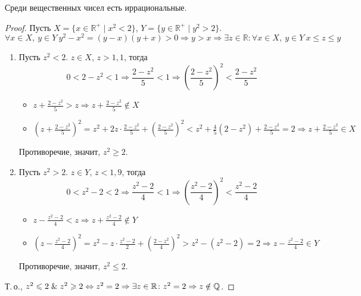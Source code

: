 \begin{statement}
Среди вещественных чисел есть иррациональные.
\end{statement}
\begin{proof}
Пусть $X = \{ x \in \mathbb R^+ \mid x^2 < 2 \}$, $Y = \{ y \in \mathbb R^+ \mid y^2 > 2 \}$.
\begin{equation*}
\forall x \in X, \ y \in Y \ y^2 - x^2 = (y - x)(y + x) > 0 \Rightarrow y > x \Rightarrow
\exists z \in \mathbb R \colon \forall x \in X, \ y \in Y \ x \leqslant z \leqslant y
\end{equation*}

\begin{enumerate}
	\item Пусть $z^2 < 2$. $z \in X$, $z > 1{,}1$, тогда
	\begin{equation*}
	0 < 2 - z^2 < 1 \Rightarrow \frac{2 - z^2}5 < 1 \Rightarrow
	\left( \frac{2 - z^2}5 \right)^2 < \frac{2 - z^2}5
	\end{equation*}
	
	\begin{itemize}
		\item $\displaystyle z + \frac{2 - z^2}5 > z \Rightarrow z + \frac{2 - z^2}5 \notin X$
		
		\item $\displaystyle \left( z + \frac{2 - z^2}5 \right)^2 =
		z^2 + 2z\cdot\frac{2 - z^2}5 + \left( \frac{2 - z^2}5 \right)^2 <
		z^2 + \frac45 (2 - z^2) + \frac{2 - z^2}5 = 2 \Rightarrow z + \frac{2 - z^2}5 \in X$
	\end{itemize}
	Противоречие, значит, $z^2 \geqslant 2$.
	
	\item Пусть $z^2 > 2$. $z \in Y$, $z < 1{,}9$, тогда
	\begin{equation*}
	0 < z^2 - 2 < 2 \Rightarrow \frac{z^2 - 2}4 < 1 \Rightarrow
	\left( \frac{z^2 - 2}4 \right)^2 < \frac{z^2 - 2}4
	\end{equation*}
	
	\begin{itemize}
		\item $\displaystyle z - \frac{z^2 - 2}4 < z \Rightarrow z + \frac{z^2 - 2}4 \notin Y$
		
		\item $\displaystyle \left( z - \frac{z^2 - 2}4 \right)^2 =
		z^2 - z\cdot\frac{z^2 - 2}2 + \left( \frac{2 - z^2}4 \right)^2 >
		z^2 - (z^2 - 2) = 2 \Rightarrow z - \frac{z^2 - 2}4 \in Y$
	\end{itemize}
	
	Противоречие, значит, $z^2 \leqslant 2$.
\end{enumerate}

Т.\,о., $z^2 \leqslant 2 \mathrel{\&} z^2 \geqslant 2 \Leftrightarrow z^2 = 2 \Rightarrow
\exists z \in \mathbb R \colon z^2 = 2 \Rightarrow z \notin \mathbb Q$.
\end{proof}